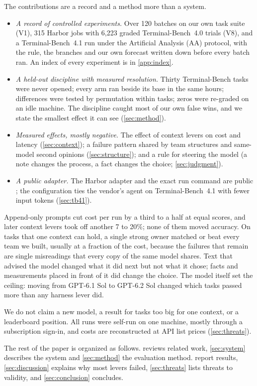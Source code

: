  The contributions are a record and a method more than a system.
\begin{itemize}[leftmargin=1.4em]
  \item \emph{A record of controlled experiments.} Over 120 batches on our own task suite (V1),
    315 Harbor jobs with 6,223 graded Terminal-Bench~4.0 trials (V8), and a Terminal-Bench~4.1 run
    under the Artificial Analysis (AA) protocol, with the rule, the branches and our own forecast
    written down before every batch ran. An index of every experiment is in \cref{app:index}.
  \item \emph{A held-out discipline with measured resolution.} Thirty Terminal-Bench tasks were never
    opened; every arm ran beside its base in the same hours; differences were tested by permutation
    within tasks; zeros were re-graded on an idle machine. The discipline caught most of our own
    false wins, and we state the smallest effect it can see (\cref{sec:method}).
  \item \emph{Measured effects, mostly negative.} The effect of context levers on cost and latency
    (\cref{sec:context}); a failure pattern shared by team structures and same-model second opinions
    (\cref{sec:structure}); and a rule for steering the model (a note changes the process, a fact
    changes the choice; \cref{sec:judgment}).
  \item \emph{A public adapter.} The Harbor adapter and the exact run command are public
    \citep{zhang2026adapter}; the configuration ties the vendor's agent on Terminal-Bench~4.1 with
    fewer input tokens (\cref{sec:tb41}).
\end{itemize}

 Append-only prompts cut cost per run by a third to a half at equal
scores, and later context levers took off another 7 to 20\%; none of them moved accuracy. On tasks
that one context can hold, a single strong owner matched or beat every team we built, usually at a
fraction of the cost, because the failures that remain are single misreadings that every copy of
the same model shares. Text that advised the model changed what it did next but not what it chose;
facts and measurements placed in front of it did change the choice. The model itself set the
ceiling: moving from GPT-6.1 Sol to GPT-6.2 Sol changed which tasks passed more than any harness
lever did.

 We do not claim a new model, a result for tasks too big for one context, or a
leaderboard position. All runs were self-run on one machine, mostly through a subscription
sign-in, and costs are reconstructed at API list prices (\cref{sec:threats}).

The rest of the paper is organized as follows.  reviews related work,
\cref{sec:system} describes the system and \cref{sec:method} the evaluation method.
 report results,
\cref{sec:discussion} explains why most levers failed, \cref{sec:threats} lists threats to
validity, and \cref{sec:conclusion} concludes.

